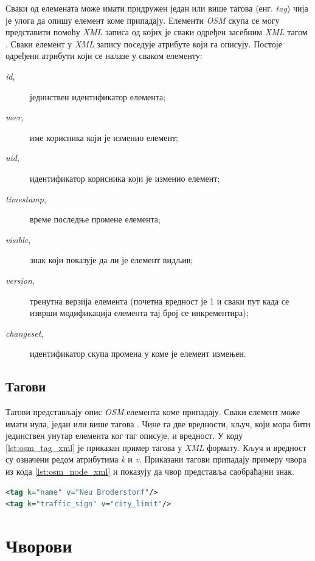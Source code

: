 \documentclass[12pt,oneside]{memoir}
\begin{document}
Сваки од елемената може имати придружен један или више тагова (енг. \textit{tag}) чија је улога да опишу елемент коме припадају. Елементи \textit{OSM} скупа се могу представити помоћу \textit{XML} записа од којих је сваки одређен засебним \textit{XML} тагом \cite{osm_xml}. Сваки елемент у \textit{XML} запису поседује атрибуте који га описују. Постоје одређени атрибути који се налазе у сваком елементу:

\begin{description}
	\item[\textit{id},] јединствен идентификатор елемента;
	\item[\textit{user},] име корисника који је изменио елемент;
	\item[\textit{uid},] идентификатор корисника који је изменио елемент;
	\item[\textit{timestamp},] време последње промене елемента;
	\item[\textit{visible},] знак који показује да ли је елемент видљив;
	\item[\textit{version},] тренутна верзија елемента (почетна вредност је 1 и сваки пут када се изврши модификација елемента тај број се инкрементира);
	\item[\textit{changeset},] идентификатор скупа промена у коме је елемент измењен.
\end{description}

\subsection{Тагови}
\label{subsec:osm_tags}

Тагови представљају опис \textit{OSM} елемента коме припадају. Сваки елемент може имати нула, један или више тагова \cite{osm_wiki}. Чине га две вредности, кључ, који мора бити јединствен унутар елемента ког таг описује, и вредност. У коду \ref{lst:osm_tag_xml} је приказан пример тагова у \textit{XML} формату. Кључ и вредност су означени редом атрибутима \textit{k} и \textit{v}. Приказани тагови припадају примеру чвора из кода \ref{lst:osm_node_xml} и показују да чвор представља саобраћајни знак.

\begin{lstlisting}[language=XML, caption={Пример \textit{OSM} тагова у \textit{XML} формату}, label={lst:osm_tag_xml}]
<tag k="name" v="Neu Broderstorf"/>
<tag k="traffic_sign" v="city_limit"/>
\end{lstlisting}

\section{Чворови}
\label{sec:osm_nodes}
\end{document}
